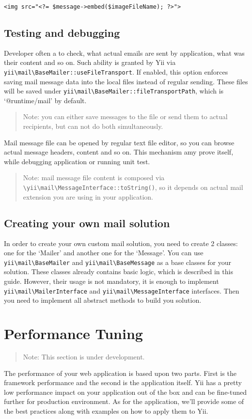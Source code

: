 \lstset{language=php}\begin{lstlisting}
<img src="<?= $message->embed($imageFileName); ?>">
\end{lstlisting}
\subsection{Testing and debugging}
Developer often a to check, what actual emails are sent by application, what was their content and so on.
Such ability is granted by Yii via \lstinline|yii\mail\BaseMailer::useFileTransport|. If enabled, this option enforces
saving mail message data into the local files instead of regular sending. These files will be saved under
\lstinline|yii\mail\BaseMailer::fileTransportPath|, which is `@runtime/mail' by default.

\begin{quote}Note: you can either save messages to the file or send them to actual recipients, but can not do both simultaneously.

\end{quote}
Mail message file can be opened by regular text file editor, so you can browse actual message headers, content and so on.
This mechanism amy prove itself, while debugging application or running unit test.

\begin{quote}Note: mail message file content is composed via \lstinline|\yii\mail\MessageInterface::toString()|, so it depends on actual
  mail extension you are using in your application.

\end{quote}
\subsection{Creating your own mail solution}
In order to create your own custom mail solution, you need to create 2 classes: one for the `Mailer' and
another one for the `Message'.
You can use \lstinline|yii\mail\BaseMailer| and \lstinline|yii\mail\BaseMessage| as a base classes for your solution. These classes
already contains basic logic, which is described in this guide. However, their usage is not mandatory, it is enough
to implement \lstinline|yii\mail\MailerInterface| and \lstinline|yii\mail\MessageInterface| interfaces.
Then you need to implement all abstract methods to build you solution.



\label{tutorial-performance-tuning.md}\section{Performance Tuning}
\begin{quote}Note: This section is under development.

\end{quote}
The performance of your web application is based upon two parts. First is the framework performance
and the second is the application itself. Yii has a pretty low performance impact
on your application out of the box and can be fine-tuned further for production
environment. As for the application, we'll provide some of the best practices
along with examples on how to apply them to Yii.

